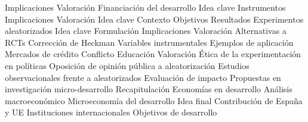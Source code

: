 \documentclass{nuevotema}
\begin{document}
\begin{esquema}[enumerate]
			\3 Implicaciones
			\3 Valoración
		\2 Financiación del desarrollo
			\3 Idea clave
			\3 Instrumentos
			\3 Implicaciones
			\3 Valoración
	\1 
		\2 Idea clave
			\3 Contexto
			\3 Objetivos
			\3 Resultados
		\2 Experimentos aleatorizados
			\3 Idea clave
			\3 Formulación
			\3 Implicaciones
			\3 Valoración
		\2 Alternativas a RCTs
			\3 Corrección de Heckman
			\3 Variables instrumentales
		\2 Ejemplos de aplicación
			\3 Mercados de crédito
			\3 Conflicto
			\3 Educación
		\2 Valoración
			\3 Ética de la experimentación en políticas
			\3 Oposición de opinión pública a aleatorización
			\3 Estudios observacionales frente a aleatorizados
			\3 Evaluación de impacto
			\3 Propuestas en investigación micro-desarrollo
	\1[] 
		\2 Recapitulación
			\3 Economías en desarrollo
			\3 Análisis macroeconómico
			\3 Microeconomía del desarrollo
		\2 Idea final
			\3 Contribución de España y UE
			\3 Instituciones internacionales
			\3 Objetivos de desarrollo

\end{esquema}

\esquemalargo
\end{document}
